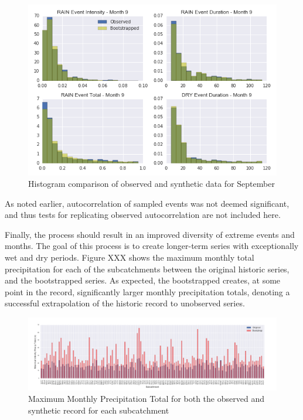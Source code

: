 \documentclass[11pt]{article} %
\begin{document}
\begin{figure}%
\center
\noindent\includegraphics[scale=.7]{./Figures/Hist_DF_Comparison_Month9} 
\caption[]{Histogram comparison of observed and synthetic data for September}
\label{HistogramPost}	
\end{figure}

As noted earlier, autocorrelation of sampled events was not deemed significant, and thus tests for replicating observed autocorrelation are not included here.

Finally, the process should result in an improved diversity of extreme events and months. The goal of this process is to create longer-term series with exceptionally wet and dry periods. Figure XXX shows the maximum monthly total precipitation for each of the subcatchments between the original historic series, and the bootstrapped series. As expected, the bootstrapped creates, at some point in the record, significantly larger monthly precipitation totals, denoting a successful extrapolation of the historic record to unobserved series.

 \begin{figure}%
 \center
\noindent\includegraphics[scale=.5]{./Figures/Monthly_Max_Prec3} 
\caption[Maximum Monthly Precipitation Total for both the observed and synthetic record for each subcatchment]
{Maximum Monthly Precipitation Total for both the observed and synthetic record for each subcatchment}
\label{MaxMonthly}	
\end{figure}
\end{document}

